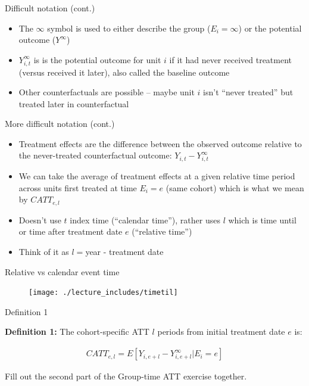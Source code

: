 \documentclass{beamer}
\begin{document}
\begin{frame}{Difficult notation (cont.)}

\begin{itemize}
\item The $\infty$ symbol is used to either describe the group ($E_i=\infty$) or the potential outcome ($Y^{\infty}$)
\item $Y^{\infty}_{i,t}$ is is the potential outcome for unit $i$ if it had never received treatment (versus received it later), also called the baseline outcome
\item Other counterfactuals are possible -- maybe unit $i$ isn't ``never treated'' but treated later in counterfactual
\end{itemize}
\end{frame}

\begin{frame}{More difficult notation (cont.)}

\begin{itemize}
\item Treatment effects are the difference between the observed outcome relative to the never-treated counterfactual outcome: $Y_{i,t} - Y^{\infty}_{i,t}$
\item We can take the average of treatment effects at a given relative time period across units first treated at time $E_i=e$ (same cohort) which is what we mean by $CATT_{e,l}$
\item Doesn't use $t$ index time (``calendar time''), rather uses $l$ which is time until or time after treatment date $e$ (``relative time'')
\item Think of it as ${l}=$year - treatment date
\end{itemize}

\end{frame}

\begin{frame}{Relative vs calendar event time}


\begin{figure}
\texttt{[image: ./lecture\_includes/timetil]}
\end{figure}

\end{frame}


\begin{frame}{Definition 1}

\textbf{Definition 1:} The cohort-specific ATT $l$ periods from initial treatment date $e$ is:

\begin{eqnarray*}
CATT_{e,l} = E[Y_{i,e+l} - Y^{\infty}_{i,e+l} | E_i=e]
\end{eqnarray*}

\bigskip

Fill out the second part of the Group-time ATT exercise together.

\end{frame}
\end{document}
